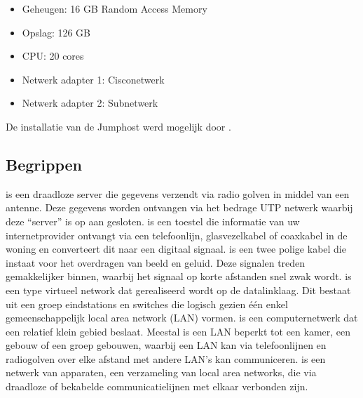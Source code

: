  
\begin{itemize}
	\item Geheugen: 16 GB Random Access Memory
	\item Opslag: 126 GB
	\item CPU: 20 cores
	\item Netwerk adapter 1: Cisco\textunderscore netwerk
	\item Netwerk adapter 2: Sub\textunderscore netwerk
\end{itemize}

De installatie van de Jumphost werd mogelijk door \cite{Win19_InstallationGuide}. 

\subsection{Begrippen}
 is een draadloze server die gegevens verzendt via radio golven in middel van een antenne. Deze gegevens worden ontvangen via het bedrage UTP netwerk waarbij deze “server” is op aan gesloten.
 is een toestel die informatie van uw internetprovider ontvangt via een telefoonlijn, glasvezelkabel of coaxkabel in de woning en converteert dit naar een digitaal signaal.
 is een twee polige kabel die instaat voor het overdragen van beeld en geluid. Deze signalen treden gemakkelijker binnen, waarbij het signaal op korte afstanden snel zwak wordt. 
 is een type virtueel network dat gerealiseerd wordt op de datalinklaag. Dit bestaat uit een groep eindstations en switches die logisch gezien één enkel gemeenschappelijk local area network (LAN) vormen.
 is een computernetwerk dat een relatief klein gebied beslaat. Meestal is een LAN beperkt tot een kamer, een gebouw of een groep gebouwen, waarbij een LAN kan via telefoonlijnen en radiogolven over elke afstand met andere LAN's kan communiceren.
  is een netwerk van apparaten, een verzameling van local area networks, die via draadloze of bekabelde communicatielijnen met elkaar verbonden zijn.

